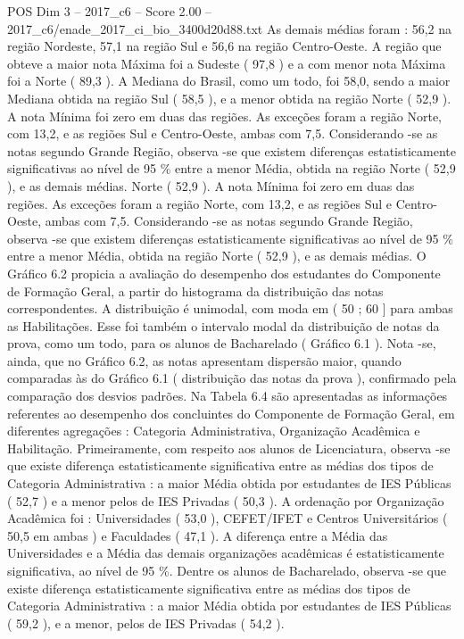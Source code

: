 \begin{textsample}{POS Dim 3 – 2017\_c6 – Score 2.00 – 2017\_c6/enade\_2017\_ci\_bio\_3400d20d88.txt}
As demais médias foram : 56,2 na região Nordeste, 57,1 na região Sul e 56,6 na região Centro-Oeste.
A região que obteve a maior nota Máxima foi a Sudeste ( 97,8 ) e a com menor nota Máxima foi a Norte ( 89,3 ).
A Mediana do Brasil, como um todo, foi 58,0, sendo a maior Mediana obtida na região Sul ( 58,5 ), e a menor obtida na região Norte ( 52,9 ).
A nota Mínima foi zero em duas das regiões.
As exceções foram a região Norte, com 13,2, e as regiões Sul e Centro-Oeste, ambas com 7,5.
Considerando -se as notas segundo Grande Região, observa -se que existem diferenças estatisticamente significativas ao nível de 95 \% entre a menor Média, obtida na região Norte ( 52,9 ), e as demais médias.
Norte ( 52,9 ).
A nota Mínima foi zero em duas das regiões.
As exceções foram a região Norte, com 13,2, e as regiões Sul e Centro-Oeste, ambas com 7,5.
Considerando -se as notas segundo Grande Região, observa -se que existem diferenças estatisticamente significativas ao nível de 95 \% entre a menor Média, obtida na região Norte ( 52,9 ), e as demais médias.
O Gráfico 6.2 propicia a avaliação do desempenho dos estudantes do Componente de Formação Geral, a partir do histograma da distribuição das notas correspondentes.
A distribuição é unimodal, com moda em ( 50 ; 60 ] para ambas as Habilitações.
Esse foi também o intervalo modal da distribuição de notas da prova, como um todo, para os alunos de Bacharelado ( Gráfico 6.1 ).
Nota -se, ainda, que no Gráfico 6.2, as notas apresentam dispersão maior, quando comparadas às do Gráfico 6.1 ( distribuição das notas da prova ), confirmado pela comparação dos desvios padrões.
Na Tabela 6.4 são apresentadas as informações referentes ao desempenho dos concluintes do Componente de Formação Geral, em diferentes agregações : Categoria Administrativa, Organização Acadêmica e Habilitação.
Primeiramente, com respeito aos alunos de Licenciatura, observa -se que existe diferença estatisticamente significativa entre as médias dos tipos de Categoria Administrativa : a maior Média obtida por estudantes de IES Públicas ( 52,7 ) e a menor pelos de IES Privadas ( 50,3 ).
A ordenação por Organização Acadêmica foi : Universidades ( 53,0 ), CEFET/IFET e Centros Universitários ( 50,5 em ambas ) e Faculdades ( 47,1 ).
A diferença entre a Média das Universidades e a Média das demais organizações acadêmicas é estatisticamente significativa, ao nível de 95 \%.
Dentre os alunos de Bacharelado, observa -se que existe diferença estatisticamente significativa entre as médias dos tipos de Categoria Administrativa : a maior Média obtida por estudantes de IES Públicas ( 59,2 ), e a menor, pelos de IES Privadas ( 54,2 ).

\end{textsample}
